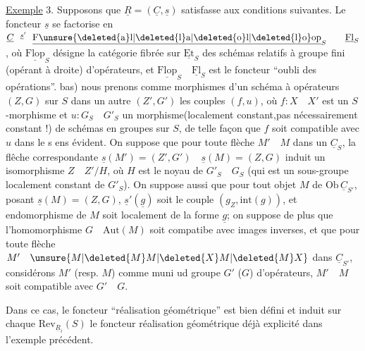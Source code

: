 \uline{Exemple} 3. Supposons que $\underline{R}=(\underline{C},\underline{s})$ satisfasse aux conditions suivantes. Le foncteur $\underline{s}$ se factorise en $\underline{C}\overset{\underline{s}'}{\qquad}\underline{\mathrm{F\unsure{\deleted{a}l|\deleted{l}a|\deleted{o}l|\deleted{l}o}op}}_S\qquad\underline{\mathrm{Fl}}_S$, où $\underline{\mathrm{Flop}}_S$ désigne la catégorie fibrée sur $\underline{\mathrm{Et}}_S$ des schémas relatifs à groupe fini (opérant à droite) d'opérateurs, et $\underline{\mathrm{Flop}}_S\quad\underline{\mathrm{Fl}}_S$ est le foncteur ``oubli des opérations''.  bas) nous prenons comme morphismes d'un schéma à opérateurs $(Z,G)$ sur $S$ dans un autre $(Z',G')$ les couples $(f,u)$, où $f:X\quad X'$ est un $S$-morphisme et $u:G_S\quad G'_S$ un morphisme(localement constant,pas nécessairement constant !) de schémas en groupes sur $S$, de telle façon que $f$ soit compatible avec $u$ dans le s ens évident. On suppose que pour toute flèche $M'\quad M$ dans un $\underline{C}_S$,  la flêche correspondante $\underline{s}(M')=(Z',G')\quad\underline{s}(M)=(Z,G)$ induit un isomorphisme $Z\quad Z'/H$, où $H$ est le noyau de $G'_S\quad G_S$ (qui est un sous-groupe localement constant de $G'_S$). On suppose  aussi que pour tout objet $M$ de $\mathrm{Ob}\,\underline{C}_{S'}$, posant $\underline{s}(M)=(Z,G)$,  $\underline{s}'(\underline{g})$ soit le couple $(g_Z,\mathrm{int}(g))$, et  endomorphisme de $M$ soit localement de la forme $\underline{g}$; on  suppose de plus que  l'homomorphisme $G\quad\mathrm{Aut}(M)$ soit compatibe avec images inverses, et que pour toute flèche $M'\quad \unsure{M|\deleted{M}M|\deleted{X}M|\deleted{M}X}$ dans $\underline{C}_{S'}$, considérons $M'$ (resp. $M$) comme muni ud groupe $G'$ ($G$) d'opérateurs, $M'\quad M$ soit compatible avec $G'\quad G$.

Dans ce cas, le foncteur ``réalisation géométrique'' est bien défini et induit sur chaque $\mathrm{Rev}_{\underline{R}_i}(S)$ le foncteur réalisation géométrique déjà explicité dans \hspace{3em} l'exemple précédent.

